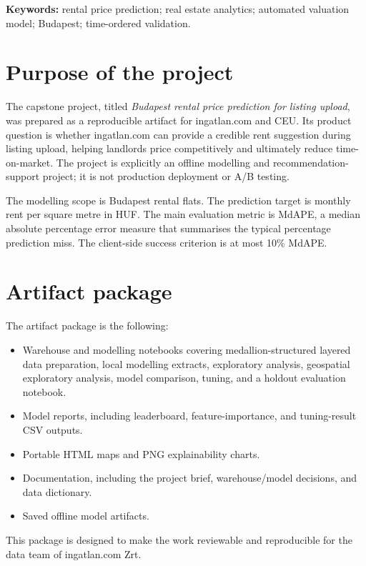 \documentclass[12pt,a4paper]{article}
\begin{document}
\noindent\textbf{Keywords:} rental price prediction; real estate analytics; automated valuation model; Budapest; time-ordered validation.

\tableofcontents
\clearpage
{}
\onehalfspacing

\section{Purpose of the project}

The capstone project, titled \emph{Budapest rental price prediction for listing upload}, was prepared as a reproducible artifact for ingatlan.com and CEU. Its product question is whether ingatlan.com can provide a credible rent suggestion during listing upload, helping landlords price competitively and ultimately reduce time-on-market. The project is explicitly an offline modelling and recommendation-support project; it is not production deployment or A/B testing.

The modelling scope is Budapest rental flats. The prediction target is monthly rent per square metre in HUF. The main evaluation metric is MdAPE, a median absolute percentage error measure that summarises the typical percentage prediction miss. The client-side success criterion is at most 10\% MdAPE.

\section{Artifact package}

The artifact package is the following:

\begin{itemize}
  \item Warehouse and modelling notebooks covering medallion-structured layered data preparation, local modelling extracts, exploratory analysis, geospatial exploratory analysis, model comparison, tuning, and a holdout evaluation notebook.
  \item Model reports, including leaderboard, feature-importance, and tuning-result CSV outputs.
  \item Portable HTML maps and PNG explainability charts.
  \item Documentation, including the project brief, warehouse/model decisions, and data dictionary.
  \item Saved offline model artifacts.
\end{itemize}

This package is designed to make the work reviewable and reproducible for the data team of ingatlan.com Zrt.
\end{document}
